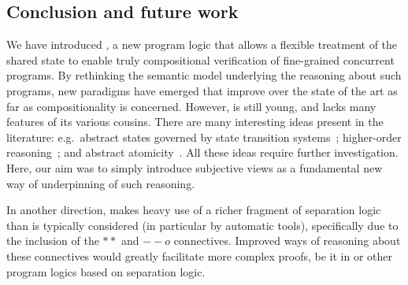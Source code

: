 \subsection*{Conclusion and future work}

We have introduced \colosl, a new program logic that allows a flexible
treatment of the shared state to enable truly compositional
verification of fine-grained concurrent programs. By rethinking the
semantic model underlying the reasoning about such programs, new
paradigms have emerged that improve over the state of the art as far
as compositionality is concerned. However, \colosl is still young, and
lacks many features of its various cousins.  There are many
interesting ideas present in the literature: e.g.\ abstract states
governed by state transition systems~\cite{caresl}; higher-order
reasoning~\cite{icap}; and abstract atomicity~\cite{tada}. All these
ideas require further investigation. Here, our aim was to simply
introduce subjective views as a fundamental new way of underpinning of
such reasoning.

In another direction, \colosl makes heavy use of a richer fragment
of separation logic than is typically considered (in particular by
automatic tools), specifically due to the inclusion of the $**$ and
$--o$ connectives. Improved ways of reasoning about these connectives
would greatly facilitate more complex proofs, be it in \colosl or
other program logics based on separation logic.

